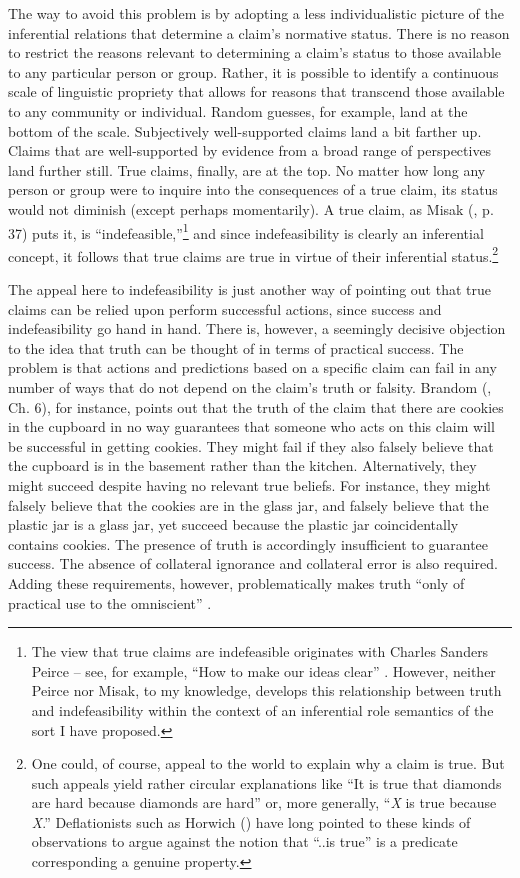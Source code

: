 The way to avoid this problem is by adopting a less individualistic picture of the inferential relations that determine a claim's normative status. There is no reason to restrict the reasons relevant to determining a claim's status to those available to any particular person or group. Rather, it is possible to identify a continuous scale of linguistic propriety that allows for reasons that transcend those available to any community or individual. Random guesses, for example, land at the bottom of the scale. Subjectively well-supported claims land a bit farther up. Claims that are well-supported by evidence from a broad range of perspectives land further still. True claims, finally, are at the top. No matter how long any person or group were to inquire into the consequences of a true claim, its status would not diminish (except perhaps momentarily). A true claim, as Misak (\citeyear{Misak:2013}, p. 37) puts it, is ``indefeasible,''\footnote{The view that true claims are indefeasible originates with Charles Sanders Peirce -- see, for example, ``How to make our ideas clear'' \citep{Peirce:1992}. However, neither Peirce nor Misak, to my knowledge, develops this relationship between truth and indefeasibility within the context of an inferential role semantics of the sort I have proposed.} and since indefeasibility is clearly an inferential concept, it follows that true claims are true in virtue of their inferential status.\footnote{One could, of course, appeal to the world to explain why a claim is true. But such appeals yield rather circular explanations like ``It is true that diamonds are hard because diamonds are hard'' or, more generally, ``\textit{X} is true because \textit{X}.'' Deflationists such as Horwich (\citeyear{Horwich:2005}) have long pointed to these kinds of observations to argue against the notion that ``..is true'' is a predicate corresponding a genuine property.}

The appeal here to indefeasibility is just another way of pointing out that true claims can be relied upon perform successful actions, since success and indefeasibility go hand in hand. There is, however, a seemingly decisive objection to the idea that truth can be thought of in terms of practical success. The problem is that actions and predictions based on a specific claim can fail in any number of ways that do not depend on the claim's truth or falsity. Brandom (\citeyear{Brandom:1994b,Brandom:2009}, Ch. 6), for instance, points out that the truth of the claim that there are cookies in the cupboard in no way guarantees that someone who acts on this claim will be successful in getting cookies. They might fail if they also falsely believe that the cupboard is in the basement rather than the kitchen. Alternatively, they might succeed despite having no relevant true beliefs. For instance, they might falsely believe that the cookies are in the glass jar, and falsely believe that the plastic jar is a glass jar, yet succeed because the plastic jar coincidentally contains cookies. The presence of truth is accordingly insufficient to guarantee success. The absence of collateral ignorance and collateral error is also required. Adding these requirements, however, problematically makes truth ``only of practical use to the omniscient'' \citep[][p. 161]{Brandom:2009}. 

